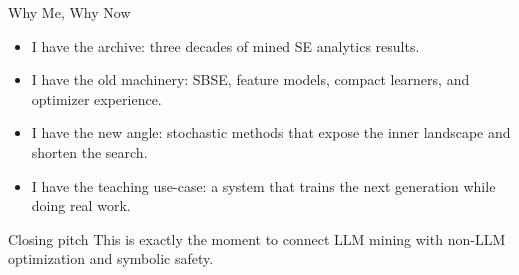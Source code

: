 \documentclass[9pt,aspectratio=169]{beamer}
\begin{document}
\begin{frame}{Why Me, Why Now}
\begin{itemize}
\item I have the archive: three decades of mined SE analytics results.
\item I have the old machinery: SBSE, feature models, compact learners, and optimizer experience.
\item I have the new angle: stochastic methods that expose the inner landscape and shorten the search.
\item I have the teaching use-case: a system that trains the next generation while doing real work.
\end{itemize}

\vspace{4mm}
\begin{block}{Closing pitch}
This is exactly the moment to connect LLM mining with non-LLM optimization and symbolic safety.
\end{block}
\end{frame}
\end{document}
